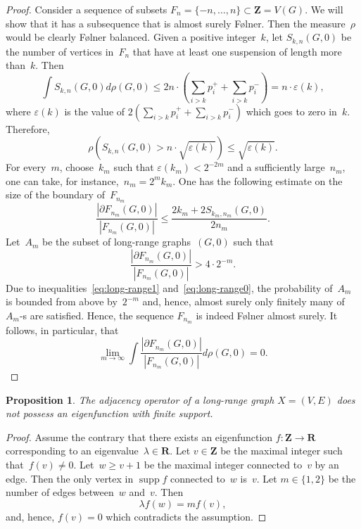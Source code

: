\documentclass[english]{article}
\newtheorem{proposition}[lemma]{Proposition}
\theoremstyle{definition}
\DeclareMathOperator{\supp}{supp}%
\newcommand*{\field}[1]{\mathbf{#1}} %
\newcommand*\Z{\field{Z}} %
\newcommand*\R{\field{R}} %
\newcommand*\eps{\varepsilon}
\begin{document}
\begin{proof}
    Consider a sequence of subsets $F_n = \{-n, \ldots,n\} \subset \Z = V(G)$. We will show that it has a subsequence that is almost surely F\o lner. Then the measure~$\rho$ would be clearly {F\o lner} balanced. 
    Given a positive integer~$k$, let $S_{k,n}(G,0)$ be the number of vertices in~$F_n$ that have at least one suspension of length more than~$k$. Then
    $$
    \int S_{k,n}(G,0) d\rho(G,0) \le2 n \cdot \left( \sum_{i > k}p_i^+ + \sum_{i > k} p_i^- \right) = n \cdot \eps(k),
    $$
    where $\eps(k)$ is the value of $2\left( \sum_{i > k}p_i^+ + \sum_{i > k} p_i^- \right)$ which goes to zero in~$k$.
    Therefore, 
    \begin{equation}\label{eq:long-range0}
        \rho\left(S_{k,n}(G,0) > n \cdot \sqrt{\eps(k)}\right) \le \sqrt{\eps(k)}.
    \end{equation}
    For every~$m$, choose~$k_m$ such that $\eps(k_m) < 2^{-2m}$ and a sufficiently large~$n_m$, one can take, for instance,~$n_m = 2^m k_m$. One has the following estimate on the size of the boundary of~$F_{n_m}$
    \begin{equation}\label{eq:long-range1}
        \frac{|\partial F_{n_m}(G,0)|}{|F_{n_m}(G,0)|} \le \frac{2k_m + 2S_{k_m,n_m}(G,0)}{2n_m}. 
    \end{equation}
    Let~$A_m$ be the subset of long-range graphs~$(G,0)$ such that 
    $$
    \frac{|\partial F_{n_m}(G,0)|}{|F_{n_m}(G,0)|} > 4 \cdot 2^{-m}.
    $$
    Due to inequalities~\eqref{eq:long-range1} and~\eqref{eq:long-range0}, the probability of~$A_m$ is bounded from above by~$2^{-m}$ and, hence, almost surely only finitely many of~$A_m$-s are satisfied. Hence, the sequence $F_{n_m}$ is indeed F\o lner almost surely. It follows, in particular, that
    $$
    \lim_{m \to \infty}\int \frac{|\partial F_{n_m}(G,0)|}{|F_{n_m}(G,0)|} d \rho(G,0) = 0.
    $$
\end{proof}

\begin{proposition}\label{proposition:long-range_eigenfunctions}
    The adjacency operator of a long-range graph $X = (V, E)$ does not possess an eigenfunction with finite support. 
\end{proposition}

\begin{proof}
    Assume the contrary that there exists an eigenfunction  $f \colon \Z \to \R$  corresponding to an eigenvalue~$\lambda \in \R$. Let $v \in \Z$ be the maximal integer such that~$f(v) \not = 0$. Let~$w \ge v + 1$ be the maximal integer connected to~$v$ by an edge. Then the only vertex in $\supp f$ connected to~$w$ is~$v$. Let $m \in \{1,2\}$ be the number of edges between~$w$ and~$v$. Then
    $$
    \lambda f(w) = m f(v),
    $$
    and, hence, $f(v) = 0$ which contradicts the assumption.
\end{proof}
\end{document}
